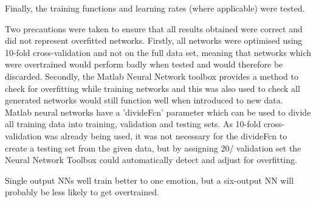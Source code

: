 \documentclass[a4paper]{article}
\begin{document}
Finally, the training functions and learning rates (where applicable) were tested.  

Two precautions were taken to ensure that all results obtained were correct and did not represent overfitted networks. Firstly, all networks were
optimised using 10-fold cross-validation and not on the full data set, meaning that networks which were overtrained would perform badly when tested
and would therefore be discarded. Secondly, the Matlab Neural Network toolbox provides a method to check for overfitting while training networks and
this was also used to check all generated networks would still function well when introduced to new data. Matlab neural networks have a 'divideFcn'
parameter which can be used to divide all training data into training, validation and testing sets. As 10-fold cross-validation was already being
used, it was not necessary for the divideFcn to create a testing set from the given data, but by assigning 20/%
validation set the Neural Network Toolbox could automatically detect and adjust for overfitting. 









Single output NNs well train better to one emotion, but a six-output NN will probably be 
less likely to get overtrained.
\end{document}
